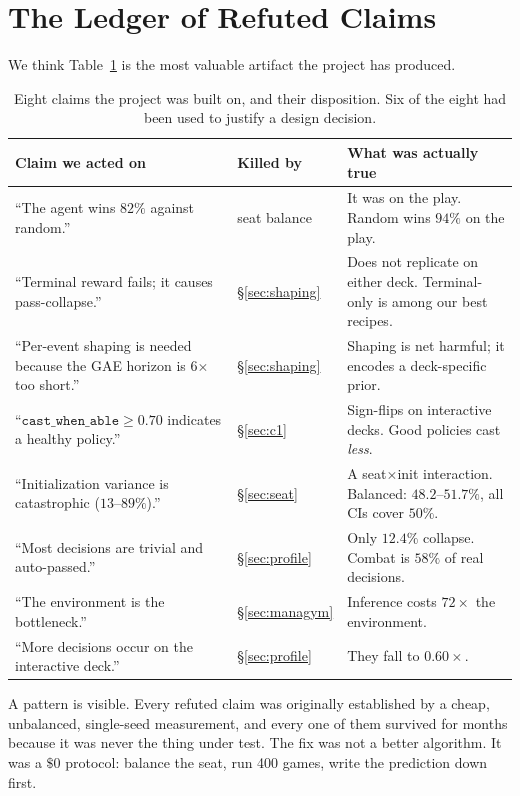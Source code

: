 \documentclass[11pt]{article}
\begin{document}
\section{The Ledger of Refuted Claims}
\label{sec:refuted}

We think Table~\ref{tab:refuted} is the most valuable artifact the project has produced.

\begin{table}[H]
\centering\small
\begin{tabular}{p{6.4cm}p{2.3cm}p{5.2cm}}
\toprule
\textbf{Claim we acted on} & \textbf{Killed by} & \textbf{What was actually true} \\
\midrule
``The agent wins $82\%$ against random.'' & seat balance & It was on the play. Random wins $94\%$ on the play. \\
``Terminal reward fails; it causes pass-collapse.'' & \S\ref{sec:shaping} & Does not replicate on either deck. Terminal-only is among our best recipes. \\
``Per-event shaping is needed because the GAE horizon is 6$\times$ too short.'' & \S\ref{sec:shaping} & Shaping is net harmful; it encodes a deck-specific prior. \\
``$\texttt{cast\_when\_able}\ge0.70$ indicates a healthy policy.'' & \S\ref{sec:c1} & Sign-flips on interactive decks. Good policies cast \emph{less}. \\
``Initialization variance is catastrophic ($13$--$89\%$).'' & \S\ref{sec:seat} & A seat$\times$init interaction. Balanced: $48.2$--$51.7\%$, all CIs cover $50\%$. \\
``Most decisions are trivial and auto-passed.'' & \S\ref{sec:profile} & Only $12.4\%$ collapse. Combat is $58\%$ of real decisions. \\
``The environment is the bottleneck.'' & \S\ref{sec:managym} & Inference costs $72\times$ the environment. \\
``More decisions occur on the interactive deck.'' & \S\ref{sec:profile} & They fall to $0.60\times$. \\
\bottomrule
\end{tabular}
\caption{Eight claims the project was built on, and their disposition. Six of the eight had been used to justify a design decision.}
\label{tab:refuted}
\end{table}

A pattern is visible. Every refuted claim was originally established by a cheap, unbalanced, single-seed measurement, and every one of them survived for months because it was never the thing under test. The fix was not a better algorithm. It was a $\$0$ protocol: balance the seat, run 400 games, write the prediction down first.
\end{document}
